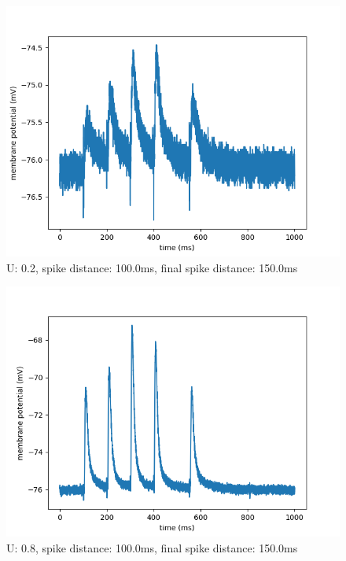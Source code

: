 \documentclass[10pt,a4paper]{scrartcl}
\begin{document}
\begin{figure} [ht]
\begin{center}
\label{fig:abb18}
\caption{U: 0.2, spike distance: 100.0ms, final spike distance: 150.0ms}
\includegraphics[scale=0.35]{pictures/final_spike_variation_7.pdf} 
\end{center}
\end{figure}

\newpage

\begin{figure} [ht]
\begin{center}
\label{fig:abb19}
\caption{U: 0.8, spike distance: 100.0ms, final spike distance: 150.0ms}
\includegraphics[scale=0.35]{pictures/final_spike_variation_8.pdf} 
\end{center}
\end{figure}
\end{document}
